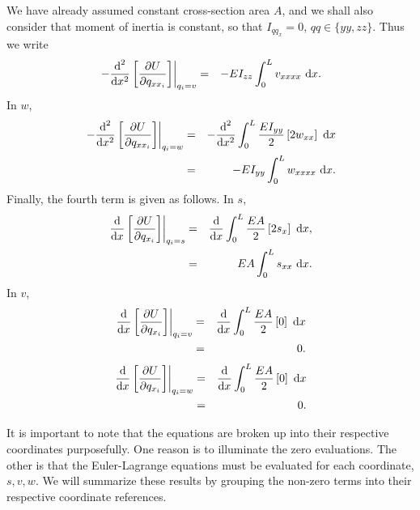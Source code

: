 We have already assumed constant cross-section area $A$, and we shall also consider that moment of inertia is constant, so that $I_{qq_{x}}=0$, $qq\in\{yy,zz\}$. Thus we write
\begin{eqnarray}
\left.-\frac{\text d^2}{\text dx^2}\left[\frac{\partial U}{\partial q_{xx_i}}\right]\right|_{q_i=v} 
&=& -EI_{zz}\int_0^L v_{xxxx}\text{ d}x. 
\end{eqnarray}
In $w$,
\begin{eqnarray}
\left.-\frac{\text d^2}{\text dx^2}\left[\frac{\partial U}{\partial q_{xx_i}}\right]\right|_{q_i=w} 
&=& -\frac{\text d^2}{\text dx^2}\int_0^L\frac{EI_{yy}}{2}\left[ 2w_{xx} \right]\text{ d}x\\
&=& -EI_{yy}\int_0^L w_{xxxx}\text{ d}x. 
\end{eqnarray}
Finally, the fourth term is given as follows. In $s$,
\begin{eqnarray}
\left.\frac{\text d}{\text dx}\left[\frac{\partial U}{\partial q_{x_i}}\right]\right|_{q_i=s} 
&=& \frac{\text d}{\text dx}\int_0^L\frac{EA}{2}\left[ 2s_{x} \right]\text{ d}x,\\
&=& EA\int_0^L s_{xx}\text{ d}x.
\end{eqnarray}
In $v$,
\begin{eqnarray}
\left.\frac{\text d}{\text dx}\left[\frac{\partial U}{\partial q_{x_i}}\right]\right|_{q_i=v} 
&=& \frac{\text d}{\text dx}\int_0^L\frac{EA}{2}\left[ 0\right]\text{ d}x\\
&=& 0.
\end{eqnarray}
\begin{eqnarray}
\left.\frac{\text d}{\text dx}\left[\frac{\partial U}{\partial q_{x_i}}\right]\right|_{q_i=w} 
&=& \frac{\text d}{\text dx}\int_0^L\frac{EA}{2}\left[ 0\right]\text{ d}x\\
&=& 0.
\end{eqnarray}

It is important to note that the equations are broken up into their respective coordinates purposefully. One reason is to illuminate the zero evaluations. The other is that the Euler-Lagrange equations must be evaluated for each coordinate, $s,v,w$. We will summarize these results by grouping the non-zero terms into their respective coordinate references.

